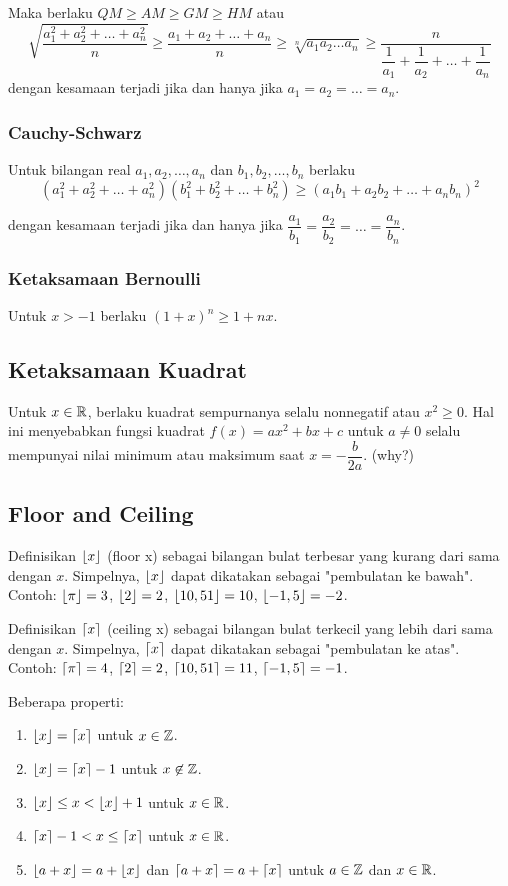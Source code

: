     Maka berlaku $QM \ge AM \ge GM \ge HM$ atau 
    $$\sqrt{\dfrac{a_1^2+a_2^2+\dots+a_n^2}{n}} \ge  \dfrac{a_1+a_2+\dots+a_n}{n}\ge
        \sqrt[n]{a_1a_2\dots a_n} \ge
        \dfrac{n}{\dfrac{1}{a_1}+\dfrac{1}{a_2}+\dots+\dfrac{1}{a_n}}$$
    dengan kesamaan terjadi jika dan hanya jika $a_1=a_2=\dots =a_n$.
    
    \subsubsection{Cauchy-Schwarz}
    Untuk bilangan real $a_1,a_2,\dots,a_n$ dan $b_1,b_2,\dots,b_n$ berlaku
    $$(a_1^2+a_2^2+\dots+a_n^2)(b_1^2+b_2^2+\dots+b_n^2) \ge (a_1b_1+a_2b_2+\dots+a_nb_n)^2$$
    
    dengan kesamaan terjadi jika dan hanya jika $\dfrac{a_1}{b_1}=\dfrac{a_2}{b_2}=\dots =\dfrac{a_n}{b_n}$.
    
    \subsubsection{Ketaksamaan Bernoulli}
    Untuk $x > -1$ berlaku $(1+x)^n \ge 1+nx$.
    
    \subsection{Ketaksamaan Kuadrat}
    Untuk $x \in \mathbb R$, berlaku kuadrat sempurnanya selalu nonnegatif atau $x^2 \ge 0$. Hal ini menyebabkan fungsi kuadrat $f(x)=ax^2+bx+c$ untuk $a \neq 0$ selalu mempunyai nilai minimum atau maksimum saat $x = -\dfrac{b}{2a}$. (why?)
     \subsection{Floor and Ceiling}
    Definisikan $\left\lfloor x \right\rfloor$ (floor x) sebagai bilangan bulat terbesar yang kurang dari sama dengan $x$. Simpelnya, $\left\lfloor x \right\rfloor$ dapat dikatakan sebagai "pembulatan ke bawah". Contoh: $\left\lfloor \pi \right\rfloor=3$, $\left\lfloor 2 \right\rfloor=2$, $\left\lfloor 10,51 \right\rfloor=10$, $\left\lfloor -1,5 \right\rfloor=-2$.
    
    Definisikan $\left\lceil x \right\rceil$ (ceiling x) sebagai bilangan bulat terkecil yang lebih dari sama dengan $x$. Simpelnya, $\left\lceil x \right\rceil$ dapat dikatakan sebagai "pembulatan ke atas". Contoh: $\left\lceil \pi \right\rceil=4$, $\left\lceil 2 \right\rceil=2$, $\left\lceil 10,51 \right\rceil=11$, $\left\lceil -1,5 \right\rceil=-1$.
    
    Beberapa properti:
    \begin{enumerate}
        \item $\left\lfloor x \right\rfloor=\left\lceil x \right\rceil$ untuk $x \in \mathbb Z$.
        \item $\left\lfloor x \right\rfloor=\left\lceil x \right\rceil-1$ untuk $x \not \in \mathbb Z$.
        \item $\left\lfloor x \right\rfloor \le  x < \left\lfloor x \right\rfloor+1$ untuk $x \in \mathbb R$.
        \item $\left\lceil x \right\rceil-1 < x \le \left\lceil x \right\rceil$ untuk $x \in \mathbb R$.
        \item $\left\lfloor a+x \right\rfloor=a+\left\lfloor x \right\rfloor$ dan $\left\lceil a+x \right\rceil=a+\left\lceil x \right\rceil$ untuk $a\in \mathbb Z$ dan $x \in \mathbb R$.
    \end{enumerate}
    
